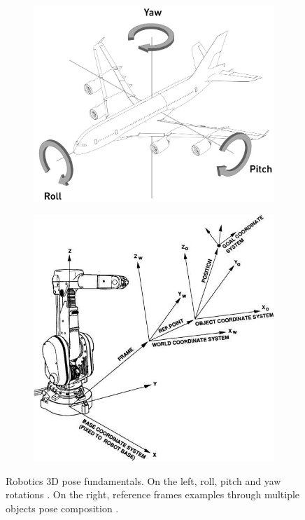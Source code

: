 \begin{figure}[H]
	\begin{center}
		\begin{subfigure}[h]{0.52\textwidth}
			\centering
			\includegraphics[width=1\textwidth]{"contents/images/02-roll-pitch-yaw"}
        	\caption[]{}
	        \label{fig:roll-pitch-yaw}
	    \end{subfigure}
		\hfill
		\begin{subfigure}[h]{0.42\textwidth}
			\centering
			\includegraphics[width=1\textwidth]{"contents/images/02-pose-transform"}
        	\caption[]{}
            \label{fig:pose-transform}
		\end{subfigure}
	\end{center}
	\vspace{-0.5cm}
	\caption[Robotics 3D pose fundamentals]{Robotics 3D pose fundamentals. On the left, roll, pitch and yaw rotations \cite{roll-pitch-yaw}. On the right, reference frames examples through multiple objects pose composition \cite{pose-transform}.}
\end{figure}

